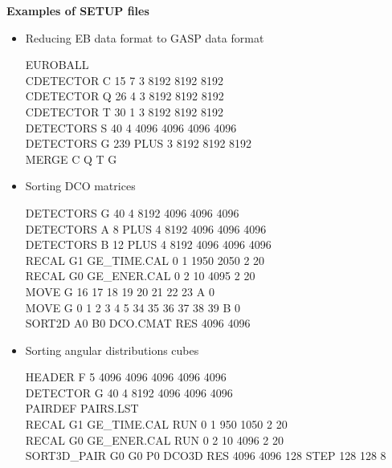 \newpage


\begin{center}
{\bf Examples of SETUP files }
\end{center}

\begin{itemize}

\item {Reducing EB data format to GASP data format}

	EUROBALL \\
	CDETECTOR C  15 7 3 8192 8192 8192 \\
	CDETECTOR Q  26 4 3 8192 8192 8192 \\
	CDETECTOR T  30 1 3 8192 8192 8192 \\
	DETECTORS S  40   4 4096 4096 4096 4096 \\
	DETECTORS G 239   PLUS 3 8192 8192 8192 \\
	MERGE   C Q T  G


\item {Sorting DCO matrices}

	DETECTORS G  40   4 8192 4096 4096 4096 \\
	DETECTORS A   8   PLUS 4 8192 4096 4096 4096 \\
	DETECTORS B  12   PLUS 4 8192 4096 4096 4096 \\
	RECAL  G1  GE\_TIME.CAL 0 1 1950 2050 2 20 \\
	RECAL  G0  GE\_ENER.CAL 0 2   10 4095 2 20 \\
	MOVE G 16 17 18 19 20 21 22 23  A  0 \\
	MOVE G  0  1  2  3  4  5 34 35 36 37 38 39  B  0 \\
	SORT2D A0 B0 DCO.CMAT  RES 4096 4096 

\item {Sorting angular distributions cubes}

	HEADER   F        5 4096 4096 4096 4096 4096 \\
	DETECTOR G   40   4 8192 4096 4096 4096 \\
	PAIRDEF PAIRS.LST \\
	RECAL G1  GE\_TIME.CAL  RUN 0 1   950  1050  2 20 \\
	RECAL G0  GE\_ENER.CAL  RUN 0 2    10  4096  2 20 \\
	SORT3D\_PAIR G0 G0 P0 DCO3D RES 4096 4096 128 STEP 128 128 8 

\end{itemize}



